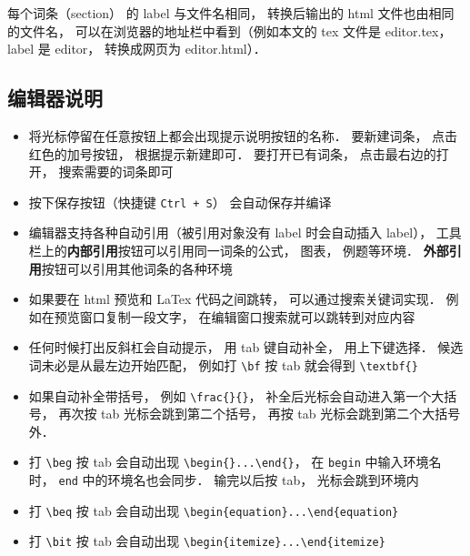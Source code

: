 每个词条（section） 的 label 与文件名相同， 转换后输出的 html 文件也由相同的文件名， 可以在浏览器的地址栏中看到（例如本文的 tex 文件是 editor.tex， label 是 editor， 转换成网页为 editor.html）．

\subsection{编辑器说明}
\begin{itemize}
\item 将光标停留在任意按钮上都会出现提示说明按钮的名称． 要新建词条， 点击红色的加号按钮， 根据提示新建即可． 要打开已有词条， 点击最右边的打开， 搜索需要的词条即可

\item 按下保存按钮（快捷键 \lstinline|Ctrl + S|） 会自动保存并编译

\item 编辑器支持各种自动引用（被引用对象没有 label 时会自动插入 label）， 工具栏上的\textbf{内部引用}按钮可以引用同一词条的公式， 图表， 例题等环境． \textbf{外部引用}按钮可以引用其他词条的各种环境

\item 如果要在 html 预览和 LaTex 代码之间跳转， 可以通过搜索关键词实现． 例如在预览窗口复制一段文字， 在编辑窗口搜索就可以跳转到对应内容

\item 任何时候打出反斜杠会自动提示， 用 tab 键自动补全， 用上下键选择． 候选词未必是从最左边开始匹配， 例如打 \lstinline|\bf| 按 tab 就会得到 \lstinline|\textbf{}|

\item 如果自动补全带括号， 例如 \lstinline|\frac{}{}|， 补全后光标会自动进入第一个大括号， 再次按 tab 光标会跳到第二个括号， 再按 tab 光标会跳到第二个大括号外．

\item 打 \lstinline|\beg| 按 tab 会自动出现 \lstinline|\begin{}...\end{}|， 在 \lstinline|begin| 中输入环境名时， \lstinline|end| 中的环境名也会同步． 输完以后按 tab， 光标会跳到环境内

\item 打 \lstinline|\beq| 按 tab 会自动出现 \lstinline|\begin{equation}...\end{equation}|

\item 打 \lstinline|\bit| 按 tab 会自动出现 \lstinline|\begin{itemize}...\end{itemize}|
\end{itemize}


